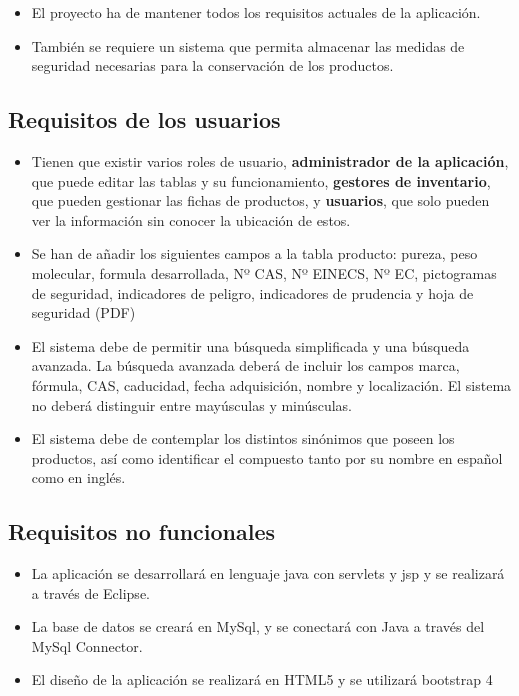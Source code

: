 \begin{itemize}
\item El proyecto ha de mantener todos los requisitos actuales de la aplicación.

\item También se requiere un sistema que permita almacenar las medidas de seguridad necesarias para la conservación de los productos.

\end{itemize}

\subsection{Requisitos de los usuarios}

\begin{itemize}

\item Tienen que existir varios roles de usuario, \textbf{administrador de la aplicación}, que puede editar las tablas y su funcionamiento, \textbf{gestores de inventario}, que pueden gestionar las fichas de productos, y \textbf{usuarios}, que solo pueden ver la información sin conocer la ubicación de estos.  

\item Se han de añadir los siguientes campos a la tabla producto: pureza, peso molecular, formula desarrollada, Nº CAS, Nº EINECS, Nº EC, pictogramas de seguridad, indicadores de peligro, indicadores de prudencia y hoja de seguridad (PDF)

\item El sistema debe de permitir una búsqueda simplificada y una búsqueda avanzada. La búsqueda avanzada deberá de incluir los campos marca, fórmula, CAS, caducidad, fecha adquisición, nombre y localización. El sistema no deberá distinguir entre mayúsculas y minúsculas.

\item El sistema debe de contemplar los distintos sinónimos que poseen los productos, así como identificar el compuesto tanto por su nombre en español como en inglés.
  
\end{itemize}

\subsection{Requisitos no funcionales}

\begin{itemize}

\item La aplicación se desarrollará en lenguaje java con servlets y jsp y se realizará a través de Eclipse.

\item La base de datos se creará en MySql, y se conectará con Java a través del MySql Connector.

\item El diseño de la aplicación se realizará en HTML5 y se utilizará bootstrap 4 

\end{itemize}

